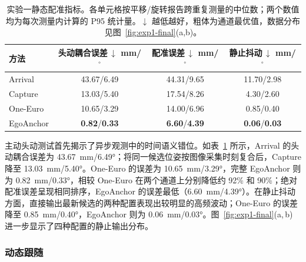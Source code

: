 \documentclass[review]{vgtc}
\begin{document}
\begin{table}[t]
\centering
\caption{实验一静态配准指标。各单元格按平移/旋转报告跨重复测量的中位数；两个数值均为每次测量内计算的 P95 统计量。$\downarrow$ 越低越好，粗体为通道最优值，数据分布见图~\ref{fig:exp1-final}(a,b)。}
\label{tab:exp1-static}
\begin{tabular}{@{}lccc@{}}
\toprule
方法 & \shortstack{头动耦合误差\,$\downarrow$\\mm/$^\circ$} & \shortstack{配准误差\,$\downarrow$\\mm/$^\circ$} & \shortstack{静止抖动\,$\downarrow$\\mm/$^\circ$} \\
\midrule
Arrival   & 43.67/6.49 & 44.31/9.65 & 11.70/2.98 \\
Capture   & 13.03/5.40 & 17.54/8.26 & 4.30/2.60 \\
One-Euro  & 10.65/3.29 & 14.00/6.96 & 0.85/0.40 \\
EgoAnchor & \textbf{0.82}/\textbf{0.33} & \textbf{6.60}/\textbf{4.39} & \textbf{0.06}/\textbf{0.03} \\
\bottomrule
\end{tabular}
\end{table}

主动头动测试首先揭示了异步观测中的时间语义错位。如表~\ref{tab:exp1-static} 所示，Arrival 的头动耦合误差为 43.67~mm/6.49°；将同一候选位姿按图像采集时刻复合后，Capture 降至 13.03~mm/5.40°。One-Euro 的误差为 10.65~mm/3.29°，完整 EgoAnchor 则为 0.82~mm/0.33°，相较 One-Euro 在两个通道上分别降低约 92\% 和 90\%；绝对配准误差呈现相同排序，EgoAnchor 的误差最低（6.60~mm/4.39°）。在静止抖动方面，直接输出最新候选的两种配置表现出较明显的高频波动；One-Euro 的误差降至 0.85~mm/0.40°，EgoAnchor 则为 0.06~mm/0.03°。图~\ref{fig:exp1-final}(a,\,b) 进一步显示了四种配置的静止输出分布。

\subsubsection{动态跟随}
\end{document}
